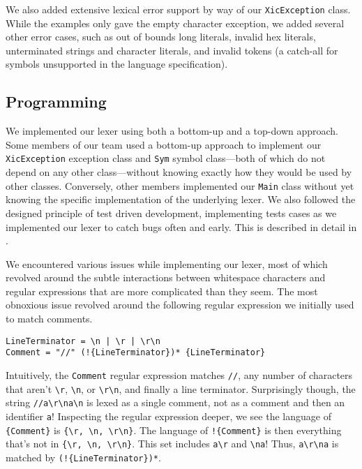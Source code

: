 \documentclass{hw}
\begin{document}
We also added extensive lexical error support by way of our
\texttt{XicException} class. While the examples only gave the empty character
exception, we added several other error cases, such as out of bounds long
literals, invalid hex literals, unterminated strings and character literals,
and invalid tokens (a catch-all for symbols unsupported in the language
specification).

\subsection{Programming}
We implemented our lexer using both a bottom-up and a top-down approach. Some
members of our team used a bottom-up approach to implement our
\texttt{XicException} exception class and \texttt{Sym} symbol class---both
of which do not depend on any other class---without knowing exactly how they
would be used by other classes. Conversely, other members implemented our
\texttt{Main} class without yet knowing the specific implementation of the
underlying lexer. We also followed the designed principle of test driven
development, implementing tests cases as we implemented our lexer to catch bugs
often and early. This is described in detail in .

We encountered various issues while implementing our lexer, most of which
revolved around the subtle interactions between whitespace characters and
regular expressions that are more complicated than they seem. The most
obnoxious issue revolved around the following regular expression we initially
used to match comments.

\begin{center}
\begin{BVerbatim}
LineTerminator = \n | \r | \r\n
Comment = "//" (!{LineTerminator})* {LineTerminator}
\end{BVerbatim}
\end{center}

Intuitively, the \texttt{Comment} regular expression matches \texttt{//}, any
number of characters that aren't \verb$\r$, \verb$\n$, or \verb$\r\n$, and
finally a line terminator. Surprisingly though, the string \verb$//a\r\na\n$ is
lexed as a single comment, not as a comment and then an identifier \verb$a$!
Inspecting the regular expression deeper, we see the language of
\verb${Comment}$ is \verb${\r, \n, \r\n}$. The language of \verb$!{Comment}$ is
then everything that's not in \verb${\r, \n, \r\n}$. This set includes
\verb$a\r$ and \verb$\na$! Thus, \verb$a\r\na$ is matched by
\verb$(!{LineTerminator})*$.
\end{document}
